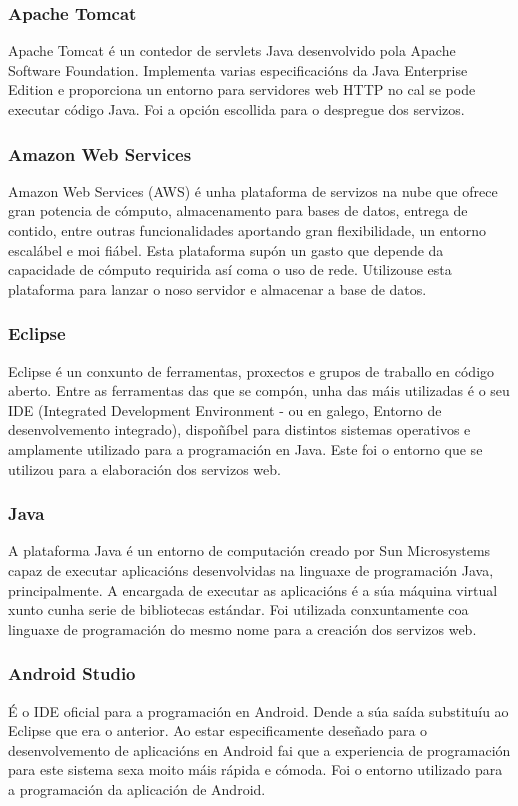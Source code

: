 \subsubsection{Apache Tomcat}
Apache Tomcat é un contedor de servlets Java desenvolvido pola Apache Software Foundation. Implementa varias especificacións da Java Enterprise Edition e proporciona un entorno para servidores web HTTP no cal se pode executar código Java. Foi a opción escollida para o despregue dos servizos.


\subsubsection{Amazon Web Services}
Amazon Web Services (AWS) é unha plataforma de servizos na nube que ofrece gran potencia de cómputo, almacenamento para bases de datos, entrega de contido, entre outras funcionalidades aportando gran flexibilidade, un entorno escalábel e moi fiábel. Esta plataforma supón un gasto que depende da capacidade de cómputo requirida así coma o uso de rede. Utilizouse esta plataforma para lanzar o noso servidor e almacenar a base de datos.


\subsubsection{Eclipse}
Eclipse é un conxunto de ferramentas, proxectos e grupos de traballo en código aberto. Entre as ferramentas das que se compón, unha das máis utilizadas é o seu IDE (Integrated Development Environment - ou en galego, Entorno de desenvolvemento integrado), dispoñíbel para distintos sistemas operativos e amplamente utilizado para a programación en Java. Este foi o entorno que se utilizou para a elaboración dos servizos web.


\subsubsection{Java}
A plataforma Java é un entorno de computación creado por Sun Microsystems capaz de executar aplicacións desenvolvidas na linguaxe de programación Java, principalmente. A encargada de executar as aplicacións é a súa máquina virtual xunto cunha serie de bibliotecas estándar. Foi utilizada conxuntamente coa linguaxe de programación do mesmo nome para a creación dos servizos web.


\subsubsection{Android Studio}
É o IDE oficial para a programación en Android. Dende a súa saída substituíu ao Eclipse que era o anterior. Ao estar especificamente deseñado para o desenvolvemento de aplicacións en Android fai que a experiencia de programación para este sistema sexa moito máis rápida e cómoda. Foi o entorno utilizado para a programación da aplicación de Android.


